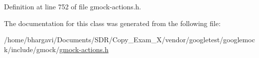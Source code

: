Definition at line 752 of file gmock-\/actions.\+h.



The documentation for this class was generated from the following file\+:\begin{DoxyCompactItemize}
\item 
/home/bhargavi/\+Documents/\+S\+D\+R/\+Copy\+\_\+\+Exam\+\_\+X/vendor/googletest/googlemock/include/gmock/\hyperlink{gmock-actions_8h}{gmock-\/actions.\+h}\end{DoxyCompactItemize}

